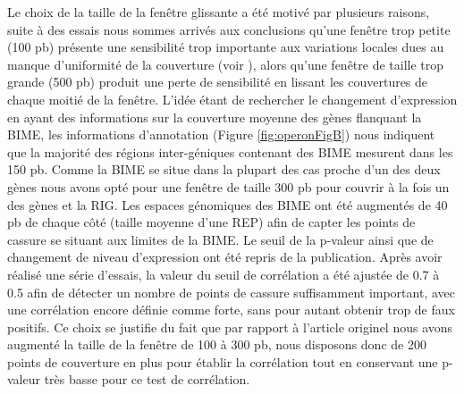 \documentclass[12pt,a4paper]{report}
\begin{document}
\begin{onehalfspace}
Le choix de la taille de la fenêtre glissante a été motivé par plusieurs raisons, suite à des essais nous sommes arrivés aux conclusions qu'une fenêtre trop petite (100 pb) présente une sensibilité trop importante aux variations locales dues au manque d'uniformité de la couverture (voir ), alors qu'une fenêtre de taille trop grande (500 pb) produit une perte de sensibilité en lissant les couvertures de chaque moitié de la fenêtre. L'idée étant de rechercher le changement d'expression en ayant des informations sur la couverture moyenne des gènes flanquant la BIME, les informations d'annotation (Figure \autoref{fig:operonFigB}) nous indiquent que la majorité des régions inter-géniques contenant des BIME mesurent dans les 150 pb. Comme la BIME se situe dans la plupart des cas proche d'un des deux gènes nous avons opté pour une fenêtre de taille 300 pb pour couvrir à la fois un des gènes et la RIG. Les espaces génomiques des BIME ont été augmentés de 40 pb de chaque côté (taille moyenne d'une REP) afin de capter les points de cassure se situant aux limites de la BIME. Le seuil de la p-valeur ainsi que de changement de niveau d'expression ont été repris de la publication. Après avoir réalisé une série d'essais, la valeur du seuil de corrélation a été ajustée de 0.7 à 0.5 afin de détecter un nombre de points de cassure suffisamment important, avec une corrélation encore définie comme forte, sans pour autant obtenir trop de faux positifs. Ce choix se justifie du fait que par rapport à l'article originel nous avons augmenté la taille de la fenêtre de 100 à 300 pb, nous disposons donc de 200 points de couverture en plus pour établir la corrélation tout en conservant une p-valeur très basse pour ce test de corrélation. 


\end{onehalfspace}
\end{document}
